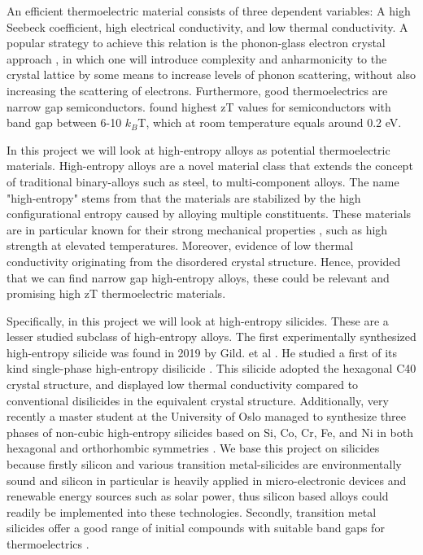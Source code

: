 \documentclass[UKenglish]{ifimaster}  %
\begin{document}
An efficient thermoelectric material consists of three dependent variables: A high Seebeck coefficient, high electrical conductivity, and low thermal conductivity. A popular strategy to achieve this relation is the phonon-glass electron crystal approach \cite{SnyderG.Jeffrey2008Ctm}, in which one will introduce complexity and anharmonicity to the crystal lattice by some means to increase levels of phonon scattering, without also increasing the scattering of electrons. Furthermore, good thermoelectrics are narrow gap semiconductors. \cite{TE_gap} found highest zT values for semiconductors with band gap between 6-10 $k_B$T, which at room temperature equals around 0.2 eV.   

In this project we will look at high-entropy alloys as potential thermoelectric materials. High-entropy alloys are a novel material class that extends the concept of traditional binary-alloys such as steel, to multi-component alloys. The name "high-entropy" stems from that the materials are stabilized by the high configurational entropy caused by alloying multiple constituents. These materials are in particular known for their strong mechanical properties \cite{hea}, such as high strength at elevated temperatures. Moreover, evidence of low thermal conductivity originating from the disordered crystal structure. Hence, provided that we can find narrow gap high-entropy alloys, these could be relevant and promising high zT thermoelectric materials.   

Specifically, in this project we will look at high-entropy silicides. These are a lesser studied subclass of high-entropy alloys. The first experimentally synthesized high-entropy silicide was found in 2019 by Gild. et al \cite{GILD2019337}. He studied a first of its kind single-phase high-entropy disilicide . This silicide adopted the hexagonal C40 crystal structure, and displayed low thermal conductivity compared to conventional disilicides in the equivalent crystal structure. Additionally, very recently a master student at the University of Oslo managed to synthesize three phases of non-cubic high-entropy silicides based on Si, Co, Cr, Fe, and Ni in both hexagonal and orthorhombic symmetries \cite{mari}. We base this project on silicides because firstly silicon and various transition metal-silicides are environmentally sound and silicon in particular is heavily applied in micro-electronic devices and renewable energy sources such as solar power, thus silicon based alloys could readily be implemented into these technologies. Secondly, transition metal silicides offer a good range of initial compounds with suitable band gaps for thermoelectrics \cite{silicde}.   
\end{document}
